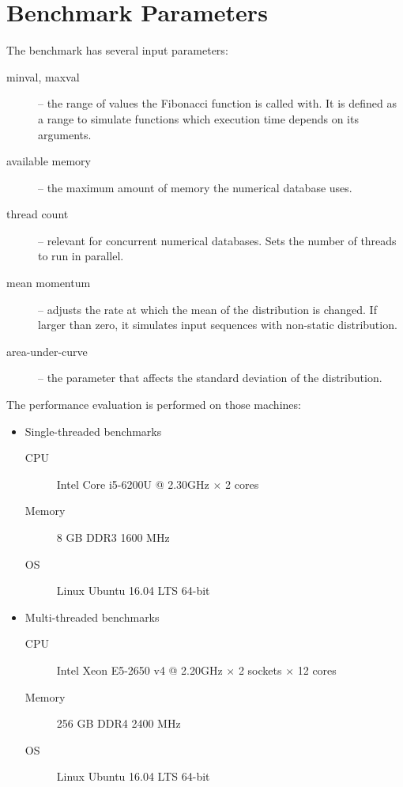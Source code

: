 \section{Benchmark Parameters}
The benchmark has several input parameters:
\begin{description}
\item [minval, maxval]-- the range of values the Fibonacci function is called with. It is defined as a range to simulate functions which execution time depends on its arguments.
\item [available memory]-- the maximum amount of memory the numerical database uses.
\item [thread count]-- relevant for concurrent numerical databases. Sets the number of  threads to run in parallel.
\item[mean momentum]-- adjusts the rate at which the mean of the distribution is changed. If larger than zero, it simulates input sequences with non-static distribution.
\item[area-under-curve]-- the parameter that affects the standard deviation of the distribution.
\end{description}

The performance evaluation is performed on those machines:
\begin{itemize}
\item Single-threaded benchmarks
\begin{description}
\item [CPU] Intel\textsuperscript{\textregistered{}} Core\textsuperscript{\textregistered{}} i5-6200U @ 2.30GHz $ \times $ 2 cores
\item [Memory] 8 GB DDR3 1600 MHz
\item [OS] Linux\textsuperscript{\textregistered{}} Ubuntu\textsuperscript{\textregistered{}} 16.04 LTS 64-bit
\end{description}
\item Multi-threaded benchmarks
\begin{description}
\item [CPU] Intel\textsuperscript{\textregistered{}} Xeon\textsuperscript{\textregistered{}} E5-2650 v4 @ 2.20GHz $ \times $ 2 sockets $ \times $ 12 cores
\item [Memory] 256 GB DDR4 2400 MHz
\item [OS] Linux\textsuperscript{\textregistered{}} Ubuntu\textsuperscript{\textregistered{}} 16.04 LTS 64-bit
\end{description}
\end{itemize}

